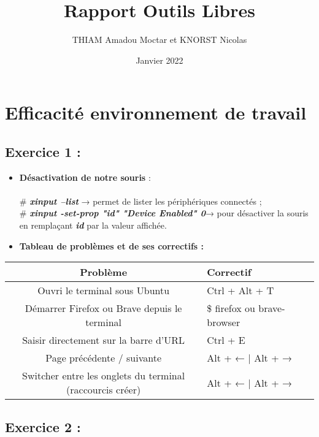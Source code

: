 \documentclass[a4paper]{article}
\title{Rapport Outils Libres}
\author{THIAM Amadou Moctar et KNORST Nicolas }
\date{Janvier 2022}
\begin{document}
\maketitle

\section{Efficacité environnement de travail}

\subsection{ Exercice 1 : }

\begin{itemize}
    \item \textbf{Désactivation de notre souris} : \\
    \\ \# \textit{\textbf{xinput --list}} → permet de lister les périphériques connectés ; \\
    \# \textit{\textbf{xinput -set-prop "id" "Device Enabled" 0}}→ pour désactiver la souris en remplaçant \textit{\textbf{id}} par la valeur affichée.\\
    
\item \textbf{Tableau de problèmes et de ses correctifs :} \\

\end{itemize} 
\begin{tabular}{|c|lr|}
     \hline 
     Problème & Correctif\\
     \hline
     Ouvri le terminal sous Ubuntu & Ctrl + Alt + T\\
     \hline
     Démarrer Firefox ou Brave depuis le terminal & \$ firefox ou brave-browser \\
     \hline
     Saisir directement sur la barre d'URL & Ctrl + E \\
     \hline
     Page précédente / suivante & Alt + ← | Alt + → \\
     \hline
     Switcher entre les onglets du terminal (raccourcis créer) & Alt + ← | Alt + → \\
\end{tabular}

\subsection{Exercice 2 :}
\end{document}
